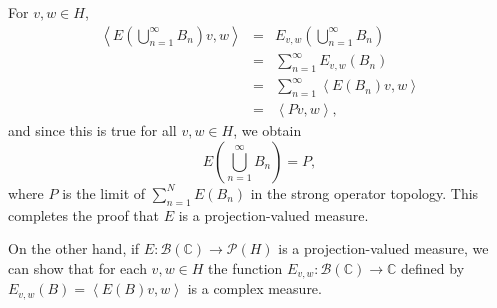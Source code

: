 \documentclass{article}
\newcommand{\inner}[2]{\left\langle #1, #2 \right\rangle}
\begin{document}
For $v, w \in H$,
\begin{eqnarray*}
\inner{E\left(\bigcup_{n=1}^\infty B_n \right)v}{w}&=&E_{v,w}\left(\bigcup_{n=1}^\infty B_n \right)\\
&=&\sum_{n=1}^\infty E_{v,w}(B_n)\\
&=&\sum_{n=1}^\infty \inner{E(B_n)v}{w}\\
&=&\inner{Pv}{w},
\end{eqnarray*}
and since this is true for all $v,w \in H$, we obtain
\[
E\left(\bigcup_{n=1}^\infty B_n \right) = P,
\]
where $P$ is the limit of $\sum_{n=1}^N E(B_n)$ in the strong operator topology. This completes the proof that $E$ is a 
projection-valued measure.

On the other hand, if $E:\mathscr{B}(\mathbb{C}) \to \mathscr{P}(H)$ is a projection-valued measure, we can show that
for each $v,w \in H$ the function $E_{v,w}:\mathscr{B}(\mathbb{C}) \to \mathbb{C}$ defined by
$E_{v,w}(B)=\inner{E(B)v}{w}$ is a complex measure.
\end{document}
